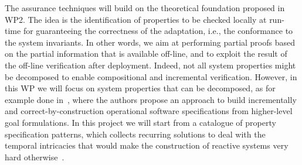 \documentclass[12pt]{article}
\begin{document}


The assurance techniques will build on the theoretical foundation proposed in WP2.  
The idea is the identification of properties to be checked locally 
at 
run-time for guaranteeing the correctness of the adaptation, i.e., the conformance to the system invariants. In other words, 
we aim at performing 
partial proofs %
based on the partial information that is available off-line, and to exploit the result of the off-line verification after deployment. 
Indeed, not all system properties might be decomposed to enable compositional and incremental verification. However, in this WP we will focus on system properties that can be decomposed, as for example done in~\cite{Letier2002}, where  the authors propose an approach to build incrementally and correct-by-construction operational software specifications from higher-level goal formulations. In this project we will start from a catalogue of property specification patterns, which collects recurring solutions to deal with the temporal intricacies that
would make the construction of reactive systems very hard
otherwise~\cite{TSE2015}.
\end{document}
